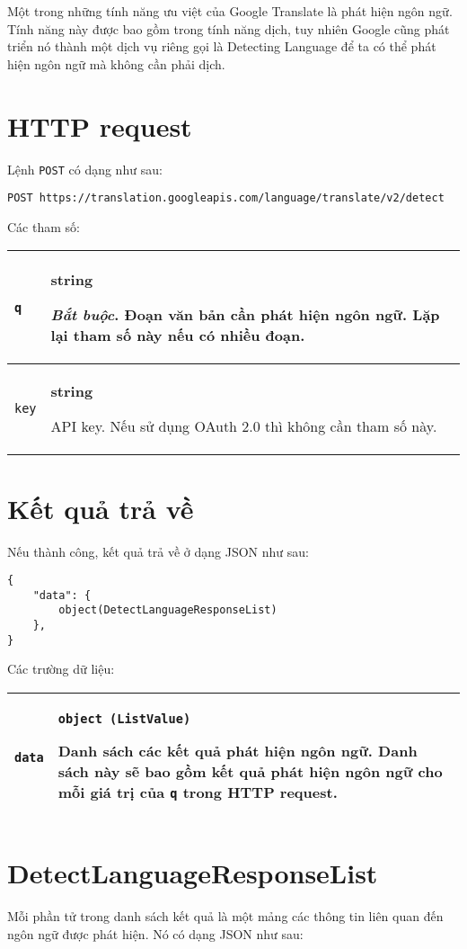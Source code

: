 \documentclass[../thesis.tex]{subfiles}
\begin{document}
Một trong những tính năng ưu việt của Google Translate là phát hiện ngôn ngữ. Tính năng này được bao gồm trong tính năng dịch, tuy nhiên Google cũng phát triển nó thành một dịch vụ riêng gọi là Detecting Language để ta có thể phát hiện ngôn ngữ mà không cần phải dịch.

\section{HTTP request}
Lệnh \lstinline{POST} có dạng như sau:
\begin{lstlisting}[style=link]
POST https://translation.googleapis.com/language/translate/v2/detect
\end{lstlisting}

Các tham số:

\begin{center}
\begin{tabularx}{\textwidth}{|p{}|X|}
\hline
\lstinline{q} & \textbf{string}

\textit{Bắt buộc}. Đoạn văn bản cần phát hiện ngôn ngữ. Lặp lại tham số này nếu có nhiều đoạn.\\
\hline
\lstinline{key} & \textbf{string}

API key. Nếu sử dụng OAuth 2.0 thì không cần tham số này.\\
\hline
\end{tabularx}
\end{center}

\section{Kết quả trả về}
Nếu thành công, kết quả trả về ở dạng JSON như sau:
\begin{lstlisting}[style=link]
{
	"data": {
		object(DetectLanguageResponseList)
	},
}
\end{lstlisting}

Các trường dữ liệu:
\begin{center}
\begin{tabularx}{\textwidth}{|p{}|X|}
\hline
\lstinline{data} & \lstinline{object (ListValue)}

Danh sách các kết quả phát hiện ngôn ngữ. Danh sách này sẽ bao gồm kết quả phát hiện ngôn ngữ cho mỗi giá trị của \lstinline{q} trong HTTP request.\\
\hline
\end{tabularx}
\end{center}

\section{DetectLanguageResponseList}
Mỗi phần tử trong danh sách kết quả là một mảng các thông tin liên quan đến ngôn ngữ được phát hiện. Nó có dạng JSON như sau:
\end{document}

